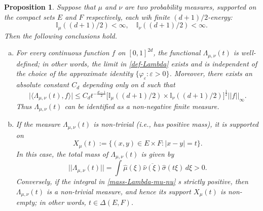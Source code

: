 \documentclass[a4paper,11pt]{amsart}
\newtheorem{prop}[thm]{\bf Proposition}
\numberwithin{equation}{section}
\begin{document}
\begin{prop} \label{Lambda-prop}
Suppose that $\mu$ and $\nu$ are two probability measures, supported on the compact sets $E$ and $F$ respectively, each wih finite $(d+1)/2$-energy: 
\begin{equation} \mathbb I_\mu ((d+1)/2) < \infty, \quad  \mathbb I_\nu ((d+1)/2) < \infty. \label{finite-energy-conditions} \end{equation} 
Then the following conclusions hold. 
\begin{enumerate}[(a)] 
\item For every continuous function $f$ on $[0,1]^{2d}$, the functional $\Lambda_{\mu, \nu}(t)$ is well-defined; in other words, the limit in \eqref{def-Lambda} exists and is independent of the choice of the approximate identity $\{\varphi_\varepsilon : \varepsilon > 0 \}$.  Moreover, there exists an absolute constant $C_d$ depending only on $d$ such that
\begin{equation}  \bigl| \langle \Lambda_{\mu, \nu}(t), f \rangle \bigr| \leq C_d t^{-\frac{d-1}{2}} \bigl[\mathbb I_\mu ((d+1)/2) \times  \mathbb I_\nu ((d+1)/2) \bigr]^{\frac{1}{2}} ||f||_{\infty}. \label{op-norm} \end{equation} 
Thus $\Lambda_{\mu, \nu}(t)$ can be identified as a non-negative finite measure.   \label{existence-part}
\vskip0.1in
\item If the measure $\Lambda_{\mu, \nu}(t)$ is non-trivial (i.e., has positive mass), it is supported on 
\begin{equation} 
X_{\mu}(t) := \bigl\{(x, y) \in E \times F : |x - y| = t \bigr\}. 
\end{equation} \label{support-part}
In this case, the total mass of $\Lambda_{\mu, \nu}(t)$ is given by 
\begin{equation}  \label{mass-Lambda-mu-nu} 
||\Lambda_{\mu, \nu}(t)|| = \int \widehat{\mu}(\xi) \overline{\widehat{\nu}(\xi)} \widehat{\sigma}(t \xi) \, d\xi > 0. 
\end{equation}  
Conversely, if the integral in \eqref{mass-Lambda-mu-nu} s strictly positive, then $\Lambda_{\mu, \nu}(t)$ is a non-trivial measure, and hence its support $X_{\mu}(t)$ is non-empty; in other words, $t \in \Delta(E, F)$. 
\end{enumerate} 
\end{prop} 
\end{document}
